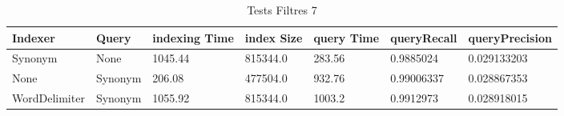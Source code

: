 \begin{table}[!htbp]
    \hspace{-2cm}
                \begin{tabular}{|p{2cm}|p{2cm}|p{2cm}|p{2cm}|p{2.5cm}|p{2.5cm}|p{2.5cm}|}
                    \hline
                    \textbf{Indexer} & \textbf{Query} & \textbf{indexing Time} & \textbf{index Size} & \textbf{query Time} & \textbf{queryRecall} & \textbf{queryPrecision}\\
                    \hline
Synonym & None & 1045.44 & 815344.0 & 283.56 & 0.9885024 & 0.029133203\\
		\hline
None & Synonym & 206.08 & 477504.0 & 932.76 & 0.99006337 & 0.028867353\\
		\hline
WordDelimiter & Synonym & 1055.92 & 815344.0 & 1003.2 & 0.9912973 & 0.028918015\\
                    \hline
                \end{tabular}
                \caption{Tests Filtres 7}
                \label{tab:tests_filtres_7}
            \end{table}
